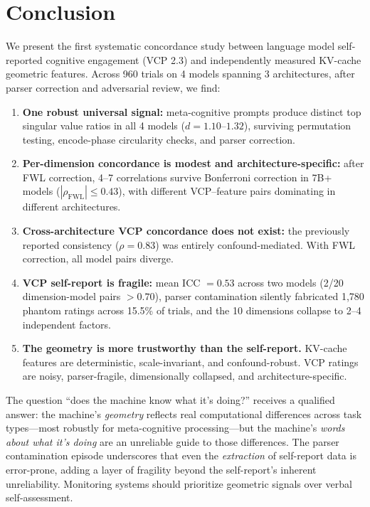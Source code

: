 \documentclass[11pt,a4paper]{article}
\begin{document}
\section{Conclusion}

We present the first systematic concordance study between language model self-reported cognitive engagement (VCP 2.3) and independently measured KV-cache geometric features. Across 960 trials on 4 models spanning 3 architectures, after parser correction and adversarial review, we find:

\begin{enumerate}
    \item \textbf{One robust universal signal:} meta-cognitive prompts produce distinct top singular value ratios in all 4 models ($d = 1.10$--$1.32$), surviving permutation testing, encode-phase circularity checks, and parser correction.

    \item \textbf{Per-dimension concordance is modest and architecture-specific:} after FWL correction, 4--7 correlations survive Bonferroni correction in 7B+ models ($|\rho_{\text{FWL}}| \leq 0.43$), with different VCP--feature pairs dominating in different architectures.

    \item \textbf{Cross-architecture VCP concordance does not exist:} the previously reported consistency ($\rho = 0.83$) was entirely confound-mediated. With FWL correction, all model pairs diverge.

    \item \textbf{VCP self-report is fragile:} mean ICC $= 0.53$ across two models (2/20 dimension-model pairs $> 0.70$), parser contamination silently fabricated 1,780 phantom ratings across 15.5\% of trials, and the 10 dimensions collapse to 2--4 independent factors.

    \item \textbf{The geometry is more trustworthy than the self-report.} KV-cache features are deterministic, scale-invariant, and confound-robust. VCP ratings are noisy, parser-fragile, dimensionally collapsed, and architecture-specific.
\end{enumerate}

The question ``does the machine know what it's doing?'' receives a qualified answer: the machine's \emph{geometry} reflects real computational differences across task types---most robustly for meta-cognitive processing---but the machine's \emph{words about what it's doing} are an unreliable guide to those differences. The parser contamination episode underscores that even the \emph{extraction} of self-report data is error-prone, adding a layer of fragility beyond the self-report's inherent unreliability. Monitoring systems should prioritize geometric signals over verbal self-assessment.
\end{document}
